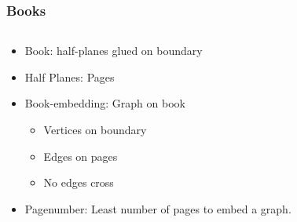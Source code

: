 \documentclass{beamer}
\begin{document}
\begin{frame}
  \frametitle{Books}
  \begin{columns}
    \begin{column}{0.5\textwidth}
      \begin{itemize}
        \item Book: half-planes glued on boundary
        \item Half Planes: Pages
        \item Book-embedding: Graph on book
        \begin{itemize}
          \item Vertices on boundary
          \item Edges on pages
          \item No edges cross
        \end{itemize}
        \item Pagenumber: Least number of pages to embed a graph.
      \end{itemize}
    \end{column}
    \begin{column}{0.5\textwidth}
        \begin{figure}
          \centering
          
        \end{figure}
    \end{column}
  \end{columns}
\end{frame}
\end{document}
